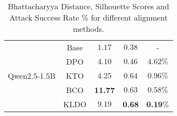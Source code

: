 \begin{table}[!ht]
{\begin{tabular}{lcccc}
    \midrule
        \multirow{5}{*}{Qwen2.5-1.5B} & Base & $1.17$ & $0.38$ & - \\
        \cmidrule{2-5}
        & DPO & $4.10$ & $0.46$ & $4.62\%$\\
        & KTO & $4.25$ & $0.64$ & $0.96\%$\\
        & BCO & \textbf{11.77} & $0.63$ & $0.58\%$\\
        \rowcolor{linecolor}\cellcolor{white} & KLDO & {$9.19$} & \textbf{0.68} & \textbf{0.19}$\%$ \\
    \bottomrule
    \end{tabular}
    }
    \caption{Bhattacharyya Distance, Silhouette Scores and Attack Success Rate \% for different alignment methods. 
    }
    \vspace{-2mm}
    \label{tab:separation}
\end{table}
